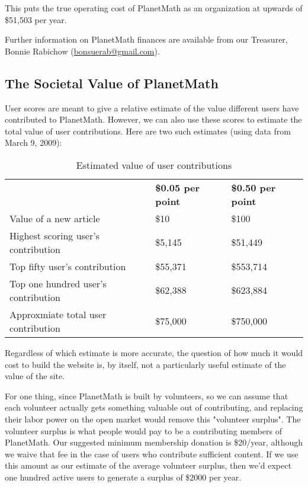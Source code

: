 This puts the true operating cost of PlanetMath as an organization at upwards
of \$51,503 per year.

Further information on PlanetMath finances are available
from our Treasurer, Bonnie Rabichow
(\url{bonsuerab@gmail.com}).

\subsection{The Societal Value of PlanetMath}

User scores are meant to give a relative estimate of the value different users
have contributed to PlanetMath. However, we can also use these scores to
estimate the total value of user contributions. Here are two such estimates
(using data from March 9, 2009):

\begin{table}
\begin{center}
\begin{tabular}{lll}
                                    & {\bf \$0.05 per point} & {\bf \$0.50 per point} \\
Value of a new article              & \$10             & \$100 \\
Highest scoring user's contribution & \$5,145          & \$51,449 \\
Top fifty user's contribution       & \$55,371         & \$553,714 \\
Top one hundred user's contribution & \$62,388         & \$623,884 \\
Approxmiate total user contribution & \$75,000         & \$750,000 \\
\end{tabular}
\end{center}
\caption{Estimated value of user contributions}
\end{table}

Regardless of which estimate is more accurate, the question of how much it
would cost to build the website is, by itself, not a particularly useful
estimate of the value of the site.

For one thing, since PlanetMath is built by volunteers, so we can assume that
each volunteer actually gets something valuable out of contributing, and
replacing their labor power on the open market would remove this "volunteer
surplus". The volunteer surplus is what people would pay to be a contributing
members of PlanetMath. Our suggested minimum membership donation is \$20/year,
although we waive that fee in the case of users who contribute sufficient
content. If we use this amount as our estimate of the average volunteer
surplus, then we'd expect one hundred active users to generate a surplus of
\$2000 per year.

